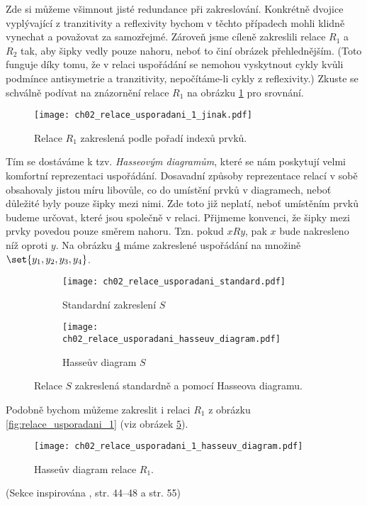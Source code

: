 Zde si můžeme všimnout jisté redundance při zakreslování. Konkrétně dvojice vyplývající z tranzitivity a reflexivity bychom v těchto případech mohli klidně vynechat a považovat za samozřejmé. Zároveň jsme cíleně zakreslili relace $R_1$ a $R_2$ tak, aby šipky vedly pouze nahoru, neboť to činí obrázek přehlednějším. (Toto funguje díky tomu, že v relaci uspořádání se nemohou vyskytnout cykly kvůli podmínce antisymetrie a tranzitivity, nepočítáme-li cykly z reflexivity.) Zkuste se schválně podívat na znázornění relace $R_1$ na obrázku \ref{fig:relace_usporadani_1_jinak} pro srovnání.
\begin{figure}[H]
    \centering
    \texttt{[image: ch02\_relace\_usporadani\_1\_jinak.pdf]}
    \caption{Relace $R_1$ zakreslená podle pořadí indexů prvků.}
    \label{fig:relace_usporadani_1_jinak}
\end{figure}
Tím se dostáváme k tzv. \emph{Hasseovým diagramům}, které se nám poskytují velmi komfortní reprezentaci uspořádání. Dosavadní způsoby reprezentace relací v sobě obsahovaly jistou míru libovůle, co do umístění prvků v diagramech, neboť důležité byly pouze šipky mezi nimi. Zde toto již neplatí, neboť umístěním prvků budeme určovat, které jsou společně v relaci. Přijmeme konvenci, že šipky mezi prvky povedou pouze směrem nahoru. Tzn. pokud $xRy$, pak $x$ bude nakresleno níž oproti $y$. Na obrázku \ref{fig:relace_usporadani_zakresleni} máme zakreslené uspořádání na množině $\set{y_1,y_2,y_3,y_4}$.
\begin{figure}[H]
    \centering
    \begin{subfigure}{6cm}
        \centering
        \texttt{[image: ch02\_relace\_usporadani\_standard.pdf]}
        \caption{Standardní zakreslení $S$}
        \label{subfig:relace_usporadani_standard}
    \end{subfigure}
    \qquad
    \begin{subfigure}{6cm}
        \centering
        \texttt{[image: ch02\_relace\_usporadani\_hasseuv\_diagram.pdf]}
        \caption{Hasseův diagram $S$}
        \label{subfig:relace_usporadani_hasseuv_diagram}
    \end{subfigure}
    \caption{Relace $S$ zakreslená standardně a pomocí Hasseova diagramu.}
    \label{fig:relace_usporadani_zakresleni}
\end{figure}
Podobně bychom můžeme zakreslit i relaci $R_1$ z obrázku \ref{fig:relace_usporadani_1} (viz obrázek \ref{fig:relace_usporadani_1_hasseuv_diagram}).
\begin{figure}[H]
    \centering
    \texttt{[image: ch02\_relace\_usporadani\_1\_hasseuv\_diagram.pdf]}
    \caption{Hasseův diagram relace $R_1$.}
    \label{fig:relace_usporadani_1_hasseuv_diagram}
\end{figure}
(Sekce inspirována \cite{MatousekNesetril2009}, str. 44--48 a str. 55)